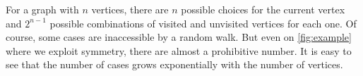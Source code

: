 \documentclass[12pt]{article}
\theoremstyle{definition}
\begin{document}
For a graph with $n$ vertices, there are $n$ possible choices for the current
vertex and $2^{n-1}$ possible combinations of visited and unvisited vertices
for each one.
Of course, some cases are inaccessible by a random walk.
But even on \cref{fig:example} where we exploit symmetry,
there are almost a prohibitive number.
It is easy to see that the number of cases 
grows exponentially with the number of vertices.

\end{document}
